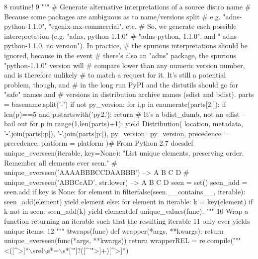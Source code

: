 \begin{DoxyCode}
8     routine!
9     \textcolor{stringliteral}{"""    # Generate alternative interpretations of a source distro name    # Because some packages are
       ambiguous as to name/versions split    # e.g. "adns-python-1.1.0", "egenix-mx-commercial", etc.    # So, we
       generate each possible interepretation (e.g. "adns, python-1.1.0"    # "adns-python, 1.1.0", and "
      adns-python-1.1.0, no version").  In practice,    # the spurious interpretations should be ignored, because in the event
          # there's also an "adns" package, the spurious "python-1.1.0" version will    # compare lower than any
       numeric version number, and is therefore unlikely    # to match a request for it.  It's still a potential
       problem, though, and    # in the long run PyPI and the distutils should go for "safe" names and    # versions
       in distribution archive names (sdist and bdist).    parts = basename.split('-')    if not py\_version:       
       for i,p in enumerate(parts[2:]):            if len(p)==5 and p.startswith('py2.'):                return #
       It's a bdist\_dumb, not an sdist -- bail out    for p in range(1,len(parts)+1):        yield Distribution(    
              location, metadata, '-'.join(parts[:p]), '-'.join(parts[p:]),            py\_version=py\_version,
       precedence = precedence,            platform = platform        )# From Python 2.7 docsdef
       unique\_everseen(iterable, key=None):    "List unique elements, preserving order. Remember all elements ever seen."    #
       unique\_everseen('AAAABBBCCDAABBB') --> A B C D    # unique\_everseen('ABBCcAD', str.lower) --> A B C D    seen = set() 
         seen\_add = seen.add    if key is None:        for element in filterfalse(seen.\_\_contains\_\_, iterable):   
               seen\_add(element)            yield element    else:        for element in iterable:            k =
       key(element)            if k not in seen:                seen\_add(k)                yield elementdef
       unique\_values(func):    """}
10     Wrap a function returning an iterable such that the resulting iterable
11     only ever yields unique items.
12     \textcolor{stringliteral}{"""    @wraps(func)    def wrapper(*args, **kwargs):        return unique\_everseen(func(*args,
       **kwargs))    return wrapperREL = re.compile("""}<([^>]*\(\backslash\)srel\(\backslash\)s*=\(\backslash\)s*[\textcolor{stringliteral}{'"]?([^'}\textcolor{stringliteral}{">]+)[^>]*)}
\end{DoxyCode}

